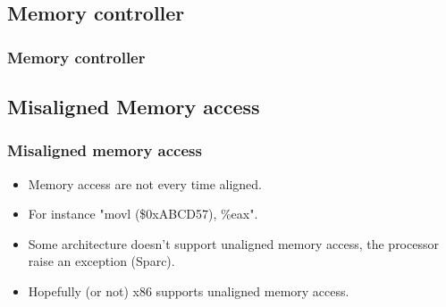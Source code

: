 \begin{frame}
\begin{center}
\begin{overlayarea}{10cm}{10cm}
    \end{overlayarea}
  \end{center}
\end{frame}


\subsection{Memory controller}
\begin{frame}
  \frametitle{Memory controller}
  \begin{center}
  \end{center}
\end{frame}


\subsection{Misaligned Memory access}
\begin{frame}
\frametitle{Misaligned memory access}
  \begin{itemize}
    \item Memory access are not every time aligned.
    \item For instance "movl (\$0xABCD57), \%eax".
    \item Some architecture doesn't support unaligned memory access, the
    processor raise an exception (Sparc).
    \item Hopefully (or not) x86 supports unaligned memory access.
  \end{itemize}
\end{frame}


